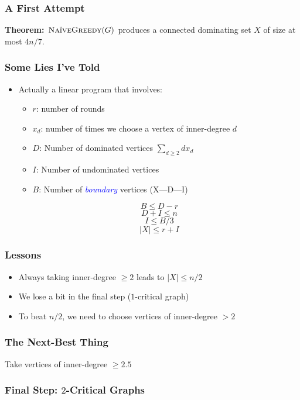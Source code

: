 \documentclass{beamer}
\newcommand{\emphh}[1]{\textcolor{blue}{\emph{#1}}}
\begin{document}
\begin{frame}
  \frametitle{A First Attempt}

  \textbf{Theorem:} $\textsc{NaïveGreedy}(G)$ produces a connected dominating set $X$ of size at most $4n/7$.\\[1em]

\end{frame}

\begin{frame}
  \frametitle{Some Lies I've Told}

  \begin{itemize}
    \item Actually a linear program that involves:
    \begin{itemize}
      \item $r$: number of rounds
      \item $x_d$: number of times we choose a vertex of inner-degree $d$
      \item $D$: Number of dominated vertices $\sum_{d\ge 2}d x_d$
      \item $I$: Number of undominated vertices
      \item $B$: Number of \emphh{boundary} vertices  (X---D---I)
    \end{itemize}
    \[
       B \le D - r
    \]
    \[
       D+I \le n
    \]
    \[
      I \le B/3
    \]
    \[
       |X| \le r + I
    \]
  \end{itemize}
\end{frame}

\begin{frame}
  \frametitle{Lessons}

  \begin{itemize}[<+->]
    \item Always taking inner-degree $\ge2$ leads to $|X|\le n/2$
    \item We lose a bit in the final step ($1$-critical graph)
    \item To beat $n/2$, we need to choose vertices of inner-degree $>2$\\[3em]
  \end{itemize}
\end{frame}


\begin{frame}
  \frametitle{The Next-Best Thing}

  Take vertices of inner-degree $\ge 2.5$

  \begin{center}
  \end{center}
\end{frame}


\begin{frame}
  \frametitle{Final Step: $2$-Critical Graphs}

  \begin{center}
\end{center}
\end{frame}
\end{document}
